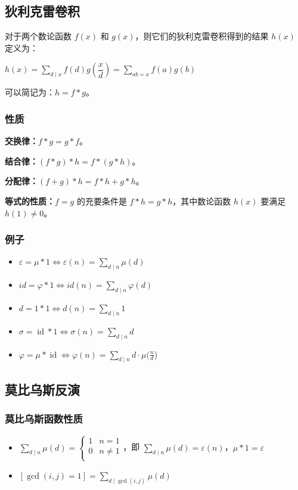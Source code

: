 \documentclass[UTF8]{ctexart}
\begin{document}
\begin{sloppypar}
\subsection{狄利克雷卷积}

对于两个数论函数 $f(x)$ 和 $g(x)$，则它们的狄利克雷卷积得到的结果 $h(x)$ 定义为：

$h(x)=\sum_{d\mid x}{f(d)g\left(\dfrac xd \right)}=\sum_{ab=x}{f(a)g(b)}$

可以简记为：$h=f*g$。

\subsubsection{性质}

\textbf{交换律：}$f*g=g*f$。

\textbf{结合律：}$(f*g)*h=f*(g*h)$。

\textbf{分配律：}$(f+g)*h=f*h+g*h$。

\textbf{等式的性质：}$f=g$ 的充要条件是 $f*h=g*h$，其中数论函数 $h(x)$ 要满足 $h(1)\ne 0$。

\subsubsection{例子}

\begin{itemize}
   \item $\varepsilon=\mu \ast 1\iff\varepsilon(n)=\sum_{d\mid n}\mu(d)$
   \item $id = \varphi * 1 \iff id(n)=\sum_{d\mid n} \varphi(d)$
   \item $d=1 \ast 1\iff d(n)=\sum_{d\mid n}1$
   \item $\sigma=\operatorname{id} \ast 1\iff\sigma(n)=\sum_{d\mid n}d$
   \item $\varphi=\mu \ast \operatorname{id}\iff\varphi(n)=\sum_{d\mid n}d\cdot\mu(\frac{n}{d}$)
\end{itemize}

\subsection{莫比乌斯反演}

\subsubsection{莫比乌斯函数性质}

\begin{itemize}
   \item $\sum_{d\mid n}\mu(d)=\begin{cases}1&n=1\\0&n\neq 1\\\end{cases}$，即 $\sum_{d\mid n}\mu(d)=\varepsilon(n)$，$\mu * 1 =\varepsilon$
   \item $\displaystyle [\gcd(i,j)=1]=\sum_{d\mid\gcd(i,j)}\mu(d)$
\end{itemize}


\end{sloppypar}
\end{document}
